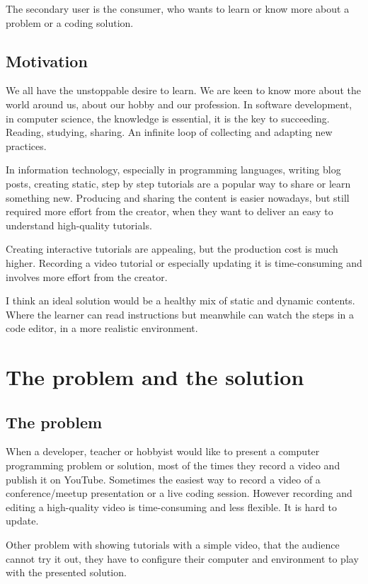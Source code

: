 \documentclass[11pt, a4paper, twoside, openright]{report}
\begin{document}
The secondary user is the consumer, who wants to learn or know more about a problem or a coding solution.

\section{Motivation}

We all have the unstoppable desire to learn. We are keen to know more about the world around us, about our hobby and our profession. In software development, in computer science, the knowledge is essential, it is the key to succeeding. Reading, studying, sharing. An infinite loop of collecting and adapting new practices.

In information technology, especially in programming languages, writing blog posts, creating static, step by step tutorials are a popular way to share or learn something new. Producing and sharing the content is easier nowadays, but still required more effort from the creator, when they want to deliver an easy to understand high-quality tutorials.

Creating interactive tutorials are appealing, but the production cost is much higher. Recording a video tutorial or especially updating it is time-consuming and involves more effort from the creator.

I think an ideal solution would be a healthy mix of static and dynamic contents. Where the learner can read instructions but meanwhile can watch the steps in a code editor, in a more realistic environment.

\chapter{The problem and the solution}

\section{The problem}

When a developer, teacher or hobbyist would like to present a computer programming problem or solution, most of the times they record a video and publish it on YouTube. Sometimes the easiest way to record a video of a conference/meetup presentation or a live coding session. However recording and editing a high-quality video is time-consuming and less flexible. It is hard to update.

Other problem with showing tutorials with a simple video, that the audience cannot try it out, they have to configure their computer and environment to play with the presented solution.
\end{document}

